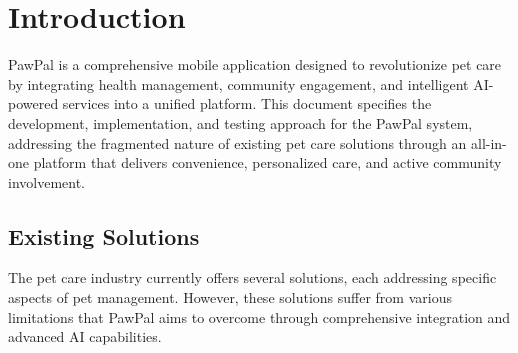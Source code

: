 \chapter{Introduction}
\label{sec:introduction}

PawPal is a comprehensive mobile application designed to revolutionize pet care by integrating health management, community engagement, and intelligent AI-powered services into a unified platform. This document specifies the development, implementation, and testing approach for the PawPal system, addressing the fragmented nature of existing pet care solutions through an all-in-one platform that delivers convenience, personalized care, and active community involvement.


\section{Existing Solutions}

The pet care industry currently offers several solutions, each addressing specific aspects of pet management. However, these solutions suffer from various limitations that PawPal aims to overcome through comprehensive integration and advanced AI capabilities.

